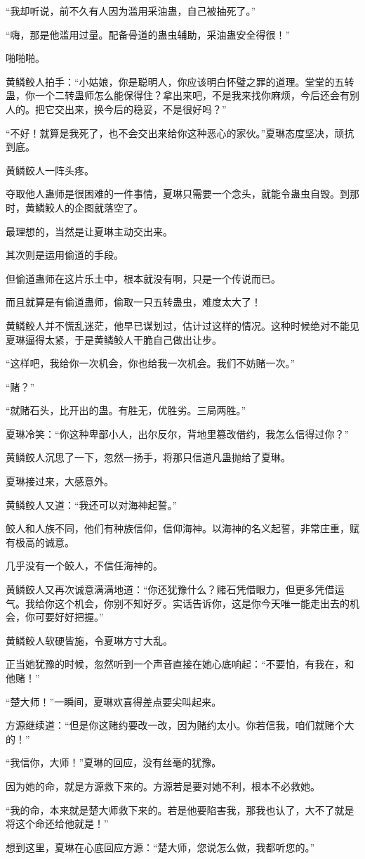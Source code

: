 \begin{this_body}
“我却听说，前不久有人因为滥用采油蛊，自己被抽死了。”

“嗨，那是他滥用过量。配备骨道的蛊虫辅助，采油蛊安全得很！”

啪啪啪。

黄鳞鲛人拍手：“小姑娘，你是聪明人，你应该明白怀璧之罪的道理。堂堂的五转蛊，你一个二转蛊师怎么能保得住？拿出来吧，不是我来找你麻烦，今后还会有别人的。把它交出来，换今后的稳妥，不是很好吗？”

“不好！就算是我死了，也不会交出来给你这种恶心的家伙。”夏琳态度坚决，顽抗到底。

黄鳞鲛人一阵头疼。

夺取他人蛊师是很困难的一件事情，夏琳只需要一个念头，就能令蛊虫自毁。到那时，黄鳞鲛人的企图就落空了。

最理想的，当然是让夏琳主动交出来。

其次则是运用偷道的手段。

但偷道蛊师在这片乐土中，根本就没有啊，只是一个传说而已。

而且就算是有偷道蛊师，偷取一只五转蛊虫，难度太大了！

黄鳞鲛人并不慌乱迷茫，他早已谋划过，估计过这样的情况。这种时候绝对不能见夏琳逼得太紧，于是黄鳞鲛人干脆自己做出让步。

“这样吧，我给你一次机会，你也给我一次机会。我们不妨赌一次。”

“赌？”

“就赌石头，比开出的蛊。有胜无，优胜劣。三局两胜。”

夏琳冷笑：“你这种卑鄙小人，出尔反尔，背地里篡改借约，我怎么信得过你？”

黄鳞鲛人沉思了一下，忽然一扬手，将那只信道凡蛊抛给了夏琳。

夏琳接过来，大感意外。

黄鳞鲛人又道：“我还可以对海神起誓。”

鲛人和人族不同，他们有种族信仰，信仰海神。以海神的名义起誓，非常庄重，赋有极高的诚意。

几乎没有一个鲛人，不信任海神的。

黄鳞鲛人又再次诚意满满地道：“你还犹豫什么？赌石凭借眼力，但更多凭借运气。我给你这个机会，你别不知好歹。实话告诉你，这是你今天唯一能走出去的机会，你可要好好把握。”

黄鳞鲛人软硬皆施，令夏琳方寸大乱。

正当她犹豫的时候，忽然听到一个声音直接在她心底响起：“不要怕，有我在，和他赌！”

“楚大师！”一瞬间，夏琳欢喜得差点要尖叫起来。

方源继续道：“但是你这赌约要改一改，因为赌约太小。你若信我，咱们就赌个大的！”

“我信你，大师！”夏琳的回应，没有丝毫的犹豫。

因为她的命，就是方源救下来的。方源若是要对她不利，根本不必救她。

“我的命，本来就是楚大师救下来的。若是他要陷害我，那我也认了，大不了就是将这个命还给他就是！”

想到这里，夏琳在心底回应方源：“楚大师，您说怎么做，我都听您的。”

\end{this_body}

